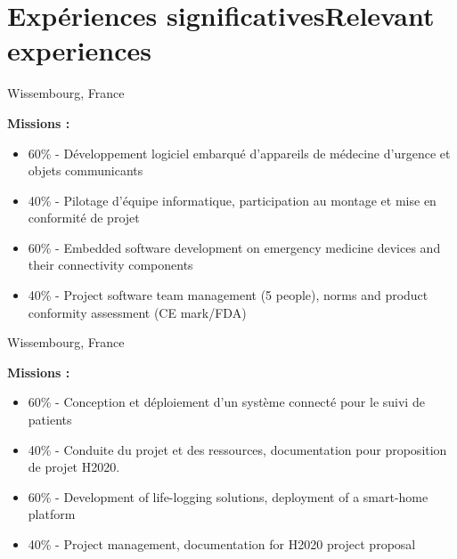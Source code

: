 \section{\ifnativelang Exp\'eriences significatives\else Relevant experiences\fi}

{}{}{Wissembourg, France}{
\textbf{Missions :} 
\begin{itemize}
\ifnativelang
\item 60\% - D\'eveloppement logiciel embarqu\'e d'appareils de médecine d'urgence et objets communicants
\item 40\% - Pilotage d'\'equipe informatique, participation au montage et mise en conformit\'e de projet
\else
\item 60\% - Embedded software development on emergency medicine devices and their connectivity components
\item 40\% - Project software team management (5 people),  norms and product conformity assessment (CE mark/FDA)
\fi
\end{itemize}
}

\vspace{\ItemsSpacing}

{}{}{Wissembourg, France}{
\textbf{Missions :} 
\begin{itemize}
\ifnativelang
\item 60\% - Conception et d\'eploiement d'un syst\`eme connect\'e pour le suivi de patients
\item 40\% - Conduite du projet et des ressources, documentation pour proposition de projet H2020.
\else
\item 60\% - Development of life-logging solutions, deployment of a smart-home platform
\item 40\% - Project management, documentation for H2020 project proposal
\fi
\end{itemize}
}

